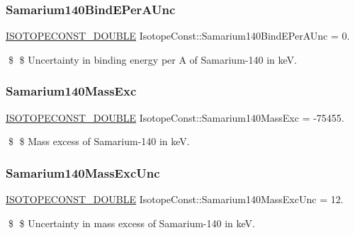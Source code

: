 \subsubsection{\texorpdfstring{Samarium140\+Bind\+E\+Per\+A\+Unc}{Samarium140BindEPerAUnc}}
{\footnotesize\ttfamily \mbox{\hyperlink{group___isotope_const-_macros_ga8f45a7272ce02c0b4c65c44636ed719a}{I\+S\+O\+T\+O\+P\+E\+C\+O\+N\+S\+T\+\_\+\+D\+O\+U\+B\+LE}} Isotope\+Const\+::\+Samarium140\+Bind\+E\+Per\+A\+Unc = 0.}

\$ \$ Uncertainty in binding energy per A of Samarium-\/140 in keV. \mbox{\label{group___isotope_const-_samarium-_sm140_ga3e726a9e4e7bec13e74bb5f714ec3278}} 
\subsubsection{\texorpdfstring{Samarium140\+Mass\+Exc}{Samarium140MassExc}}
{\footnotesize\ttfamily \mbox{\hyperlink{group___isotope_const-_macros_ga8f45a7272ce02c0b4c65c44636ed719a}{I\+S\+O\+T\+O\+P\+E\+C\+O\+N\+S\+T\+\_\+\+D\+O\+U\+B\+LE}} Isotope\+Const\+::\+Samarium140\+Mass\+Exc = -\/75455.}

\$ \$ Mass excess of Samarium-\/140 in keV. \mbox{\label{group___isotope_const-_samarium-_sm140_gafcd3de8a1d22db25098b58f444b24f30}} 
\subsubsection{\texorpdfstring{Samarium140\+Mass\+Exc\+Unc}{Samarium140MassExcUnc}}
{\footnotesize\ttfamily \mbox{\hyperlink{group___isotope_const-_macros_ga8f45a7272ce02c0b4c65c44636ed719a}{I\+S\+O\+T\+O\+P\+E\+C\+O\+N\+S\+T\+\_\+\+D\+O\+U\+B\+LE}} Isotope\+Const\+::\+Samarium140\+Mass\+Exc\+Unc = 12.}

\$ \$ Uncertainty in mass excess of Samarium-\/140 in keV. \mbox{\label{group___isotope_const-_samarium-_sm140_ga7ca9931a980b0b68196afef9f2972268}} 
